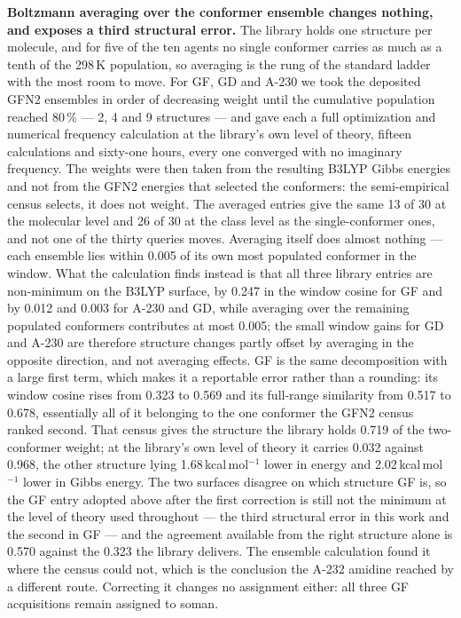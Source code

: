 \documentclass[review,12pt]{elsarticle}
\begin{document}
\textbf{Boltzmann averaging over the conformer ensemble changes nothing, and exposes a
third structural error.} The library holds one structure per molecule, and for five of the
ten agents no single conformer carries as much as a tenth of the 298\,K population, so
averaging is the rung of the standard ladder with the most room to move. For GF, GD and
A-230 we took the deposited GFN2 ensembles in order of decreasing weight until the
cumulative population reached 80\,\% --- 2, 4 and 9 structures --- and gave each a full
optimization and numerical frequency calculation at the library's own level of theory,
fifteen calculations and sixty-one hours, every one converged with no imaginary frequency.
The weights were then taken from the resulting B3LYP Gibbs energies and not from the GFN2
energies that selected the conformers: the semi-empirical census selects, it does not
weight. The averaged entries give the same 13 of 30 at the molecular level and 26 of 30 at
the class level as the single-conformer ones, and not one of the thirty queries moves.
Averaging itself does almost nothing --- each ensemble lies within 0.005 of its own most
populated conformer in the window. What the calculation finds instead is that all three
library entries are non-minimum on the B3LYP surface, by 0.247 in the window cosine for GF
and by 0.012 and 0.003 for A-230 and GD, while averaging over the remaining populated
conformers contributes at most 0.005; the small window gains for GD and A-230 are therefore
structure changes partly offset by averaging in the opposite direction, and not averaging
effects. GF is the same decomposition with a large first term, which makes it a reportable
error rather than a rounding: its window cosine rises from 0.323 to 0.569 and its
full-range similarity from 0.517 to 0.678, essentially all of it belonging to the one
conformer the GFN2 census ranked second. That census gives the structure the library holds
0.719 of the two-conformer weight; at the library's own level of theory it carries 0.032
against 0.968, the other structure lying 1.68\,kcal\,mol$^{-1}$ lower in energy and
2.02\,kcal\,mol$^{-1}$ lower in Gibbs energy. The two surfaces disagree on which structure
GF is, so the GF entry adopted above after the first correction is still not the minimum at
the level of theory used throughout --- the third structural error in this work and the
second in GF --- and the agreement available from the right structure alone is 0.570
against the 0.323 the library delivers. The ensemble calculation found it where the census
could not, which is the conclusion the A-232 amidine reached by a different route.
Correcting it changes no assignment either: all three GF acquisitions remain assigned to
soman.
\end{document}
